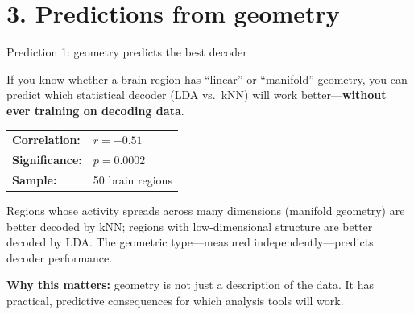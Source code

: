 \documentclass[aspectratio=169,11pt]{beamer}
\begin{document}
\section{3. Predictions from geometry}

\begin{frame}{Prediction 1: geometry predicts the best decoder}

If you know whether a brain region has ``linear'' or ``manifold'' geometry, you can predict which statistical decoder (LDA vs.\ kNN) will work better---\textbf{without ever training on decoding data}.

\vspace{0.4em}

\begin{center}
{\small
\begin{tabular}{ll}
\textbf{Correlation:} & $r = -0.51$ \\[0.2em]
\textbf{Significance:} & $p = 0.0002$ \\[0.2em]
\textbf{Sample:} & 50 brain regions \\
\end{tabular}
}
\end{center}

\vspace{0.4em}

Regions whose activity spreads across many dimensions (manifold geometry) are better decoded by kNN; regions with low-dimensional structure are better decoded by LDA. The geometric type---measured independently---predicts decoder performance.

\vspace{0.4em}
{\small \textbf{Why this matters:} geometry is not just a description of the data. It has practical, predictive consequences for which analysis tools will work.}
\end{frame}
\end{document}
